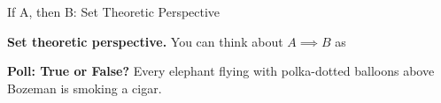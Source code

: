 \documentclass[10pt]{beamer}
\begin{document}
\begin{frame}{If A, then B: Set Theoretic Perspective}
\vfill 
\pause 

 \vfill 
 \pause 
\vfill  
\colorbox{yellow!30}{\textbf{Set theoretic perspective.}}  You can think about $A \implies B$ as 

\end{frame}


{ 
\begin{frame}
\centering 
\Large \color{black} \textbf{Poll: True or False?} Every elephant flying with polka-dotted balloons above Bozeman is smoking a cigar. \color{black}
\vfill \vfill \vfill \vfill 
\end{frame}
}
\end{document}

